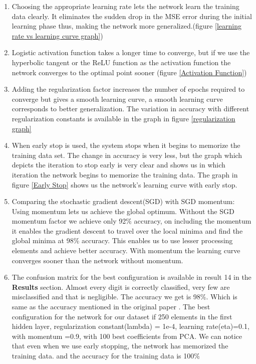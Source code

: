 \documentclass[conference]{IEEEtran}
\begin{document}
\begin{enumerate}
\item Choosing the appropriate learning rate lets the network learn the training data clearly. It eliminates the sudden drop in the MSE error during the initial learning phase thus, making the network more generalized.(figure \ref{learning rate vs learning curve graph})
\item Logistic activation function takes a longer time to converge, but if we use the hyperbolic tangent or the ReLU function as the activation function the network converges to the optimal point sooner (figure \ref{Activation Function})
\item Adding the regularization factor increases the number of epochs required to converge but gives a smooth learning curve, a smooth learning curve corresponds to better generalization. The variation in accuracy with different regularization constants is available in the graph in figure \ref{regularization graph}
\item When early stop is used, the system stops when it begins to memorize the training data set. The change in accuracy is very less, but the graph which depicts the iteration to stop early is very clear and shows us in which iteration the network begins to memorize the training data. The graph in figure \ref {Early Stop} shows us the network's learning curve with early stop.
\item Comparing the stochastic gradient descent(SGD) with SGD momentum: Using momentum lets us achieve the global optimum. Without the SGD momentum factor we achieve only 92\% accuracy, on including the momentum it enables the gradient descent to travel over the local minima and find the global minima at 98\% accuracy. This enables us to use lesser processing elements and achieve better accuracy. With momentum the learning curve converges sooner than the network without momentum.
\item The confusion matrix for the best configuration is available in result 14 in the \textbf{Results} section. Almost every digit is correctly classified, very few are misclassified and that is negligible. The accuracy we get is 98\%. Which is same as the accuracy mentioned in the original paper \cite{MNIST}.  The best configuration for the network for our dataset if 250 elements in the first hidden layer, regularization constant(lambda) = 1e-4, learning rate(eta)=0.1, with momentum =0.9, with 100 best coefficients from PCA. We can notice that even when we use early stopping, the network has memorized the training data. and the accuracy for the training data is 100\%

\end{enumerate}
\end{document}
